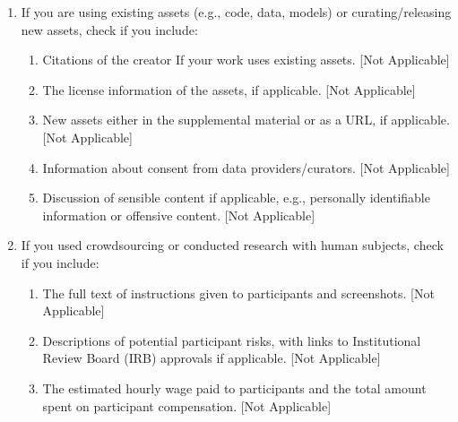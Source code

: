 \documentclass[twoside]{article}
\begin{document}
\begin{enumerate}
 \item If you are using existing assets (e.g., code, data, models) or curating/releasing new assets, check if you include:
 \begin{enumerate}
   \item Citations of the creator If your work uses existing assets. [Not Applicable]
   \item The license information of the assets, if applicable. [Not Applicable]
   \item New assets either in the supplemental material or as a URL, if applicable. [Not Applicable]
   \item Information about consent from data providers/curators. [Not Applicable]
   \item Discussion of sensible content if applicable, e.g., personally identifiable information or offensive content. [Not Applicable]
 \end{enumerate}

 \item If you used crowdsourcing or conducted research with human subjects, check if you include:
 \begin{enumerate}
   \item The full text of instructions given to participants and screenshots. [Not Applicable]
   \item Descriptions of potential participant risks, with links to Institutional Review Board (IRB) approvals if applicable. [Not Applicable]
   \item The estimated hourly wage paid to participants and the total amount spent on participant compensation. [Not Applicable]
 \end{enumerate}

 \end{enumerate}
\end{document}
